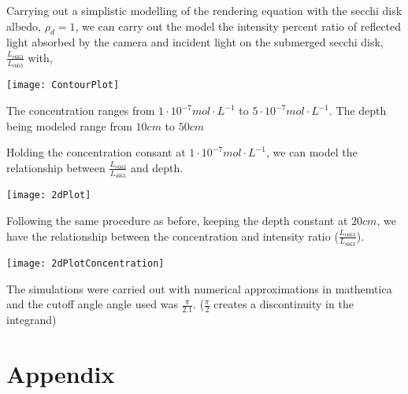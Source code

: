 \documentclass{article}
\begin{document}
Carrying out a simplistic modelling of the rendering equation with the secchi disk albedo, $ \rho_d = 1$,
we can carry out the model the intensity percent ratio of reflected light absorbed by the camera and incident light on
the submerged secchi disk, $ \frac{L_{r663}}{L_{i 663}}$ with,
\begin{center}
    \texttt{[image: ContourPlot]}
\end{center}

The concentration ranges from $ 1 \cdot 10^{-7} mol\cdot L^{-1}$ to $5 \cdot 10^{-7} mol\cdot L^{-1}$. The depth being modeled
range from $10cm$ to $ 50cm$

Holding the concentration consant at $ 1 \cdot 10^{-7} mol\cdot L^{-1}$, we can model the
relationship between $ \frac{L_{r663}}{L_{i663}}$ and depth.
\begin{center}
    \texttt{[image: 2dPlot]}
\end{center}

Following the same procedure as before, keeping the depth constant at $ 20 cm$, we have the relationship between the
concentration and intensity ratio ($ \frac{L_{r663}}{L_{i663}}$).
\begin{center}
  \texttt{[image: 2dPlotConcentration]}
\end{center}

The simulations were carried out with numerical approximations in mathemtica and the cutoff angle angle used was $ \frac{\pi}{2.1}$.
($\frac{\pi}{2}$ creates a discontinuity in the integrand)
\section{Appendix}
\end{document}

